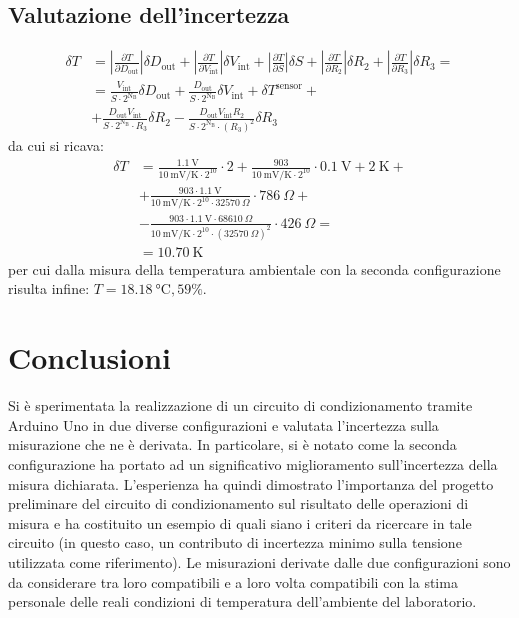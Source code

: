 \documentclass{article}
\begin{document}
\subsection{Valutazione dell'incertezza}
\begin{equation*}
    \begin{split}    
        \delta T&=\left|\frac{\partial T}{\partial D_{\text{out}}}\right|\delta D_{\text{out}}+\left|\frac{\partial T}{\partial V_{\text{int}}}\right|\delta V_{\text{int}}+\left|\frac{\partial T}{\partial S}\right|\delta S+\left|\frac{\partial T}{\partial R_2}\right|\delta R_2+\left|\frac{\partial T}{\partial R_3}\right|\delta R_3 =\\
        &=\frac{V_{\text{int}}}{S\cdot2^{\text{N}_\text{B}}}\delta D_{\text{out}}+\frac{D_{\text{out}}}{S\cdot2^{\text{N}_\text{B}}}\delta V_{\text{int}}+\delta T^{\text{sensor}}+\\
        &+\frac{D_{\text{out}}V_{\text{int}}}{S\cdot2^{\text{N}_\text{B}}\cdot R_3}\delta R_2-\frac{D_{\text{out}}V_{\text{int}}R_2}{S\cdot2^{\text{N}_\text{B}}\cdot {\left(R_3\right)}^2}\delta R_3
    \end{split}    
\end{equation*}
da cui si ricava:
\begin{equation*}
    \begin{split}
        \delta T&=\frac{\SI{1.1}\volt}{\SI{10}{\milli\volt\per\kelvin}\cdot2^{10}}\cdot 2+\frac{903}{\SI{10}{\milli\volt\per\kelvin}\cdot 2^{10}}\cdot\SI{0.1}{\volt}+\SI{2}{\kelvin}+\\
        &+\frac{903\cdot\SI{1.1}{\volt}}{\SI{10}{\milli\volt\per\kelvin}\cdot 2^{10}\cdot \SI{32570}{\Omega}}\cdot\SI{786}{\Omega}+\\
        &- \frac{903\cdot\SI{1.1}{\volt}\cdot\SI{68610}{\Omega}}{\SI{10}{\milli\volt\per\kelvin}\cdot 2^{10}\cdot{\left(\SI{32570}{\Omega}\right)}^2}\cdot\SI{426}{\Omega}=\\
        &=\SI{10.70}{\kelvin}
    \end{split}
\end{equation*}
per cui dalla misura della temperatura ambientale con la seconda configurazione risulta infine: $T = \SI{18.18}{\celsius}, 59\%$.
\section{Conclusioni}
Si è sperimentata la realizzazione di un circuito di condizionamento tramite Arduino Uno in due diverse configurazioni e valutata l'incertezza sulla misurazione che ne è derivata. In particolare, si è notato come la seconda configurazione ha portato ad un significativo miglioramento sull'incertezza della misura dichiarata. L'esperienza ha quindi dimostrato l'importanza del progetto preliminare del circuito di condizionamento sul risultato delle operazioni di misura
e ha costituito un esempio di quali siano i criteri da ricercare in tale circuito (in questo caso, un contributo di incertezza minimo sulla tensione utilizzata come riferimento).
Le misurazioni derivate dalle due configurazioni sono da considerare tra loro compatibili e a loro volta compatibili con la stima personale delle reali condizioni di temperatura dell'ambiente del laboratorio. 
\end{document}
